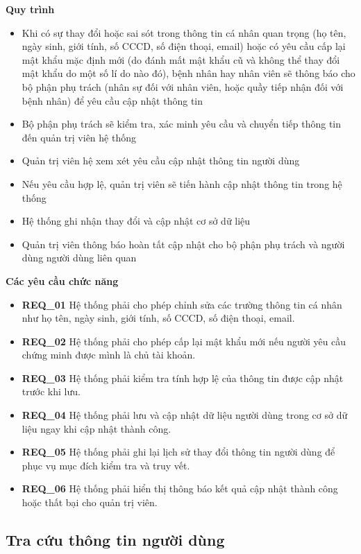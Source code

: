 \noindent \textbf{Quy trình}

\begin{itemize}
  \item Khi có sự thay đổi hoặc sai sót trong thông tin cá nhân quan trọng (họ tên, ngày sinh, giới tính, số CCCD, số điện thoại, email) hoặc có yêu cầu cấp lại mật khẩu mặc định mới (do đánh mất mật khẩu cũ và không thể thay đổi mật khẩu do một số lí do nào đó), bệnh nhân hay nhân viên sẽ thông báo cho bộ phận phụ trách (nhân sự đối với nhân viên, hoặc quầy tiếp nhận đối với bệnh nhân) để yêu cầu cập nhật thông tin
  \item Bộ phận phụ trách sẽ kiểm tra, xác minh yêu cầu và chuyển tiếp thông tin đến quản trị viên hệ thống
  \item Quản trị viên hệ xem xét yêu cầu cập nhật thông tin người dùng
  \item Nếu yêu cầu hợp lệ, quản trị viên sẽ tiến hành cập nhật thông tin trong hệ thống
  \item Hệ thống ghi nhận thay đổi và cập nhật cơ sở dữ liệu
  \item Quản trị viên thông báo hoàn tất cập nhật cho bộ phận phụ trách và người dùng người dùng liên quan
\end{itemize}

\noindent \textbf{Các yêu cầu chức năng}

\begin{itemize}
  \item \textbf{REQ\_01} Hệ thống phải cho phép chỉnh sửa các trường thông tin cá nhân như họ tên, ngày sinh, giới tính, số CCCD, số điện thoại, email.
  \item \textbf{REQ\_02} Hệ thống phải cho phép cấp lại mật khẩu mới nếu người yêu cầu chứng minh được mình là chủ tài khoản.
  \item \textbf{REQ\_03} Hệ thống phải kiểm tra tính hợp lệ của thông tin được cập nhật trước khi lưu.
  \item \textbf{REQ\_04} Hệ thống phải lưu và cập nhật dữ liệu người dùng trong cơ sở dữ liệu ngay khi cập nhật thành công.
  \item \textbf{REQ\_05} Hệ thống phải ghi lại lịch sử thay đổi thông tin người dùng để phục vụ mục đích kiểm tra và truy vết.
  \item \textbf{REQ\_06} Hệ thống phải hiển thị thông báo kết quả cập nhật thành công hoặc thất bại cho quản trị viên.
\end{itemize}

\subsection{Tra cứu thông tin người dùng}

